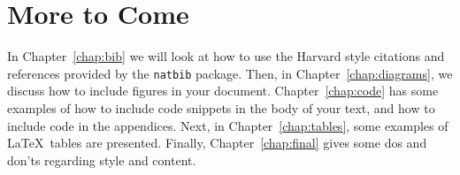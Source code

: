 \section{More to Come}
In Chapter~\ref{chap:bib} we will look at how to use the Harvard style
citations and references provided by the {\tt natbib} package.
Then, in Chapter~\ref{chap:diagrams}, we discuss how to include
figures in your document.
Chapter~\ref{chap:code} has some examples of how to include code
snippets in the body of your text, and how to include code in the
appendices. Next, in Chapter~\ref{chap:tables}, some examples of
\LaTeX\ tables are presented.  Finally, Chapter~\ref{chap:final}
gives some dos and don'ts regarding style and content.
